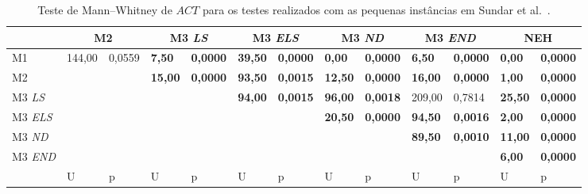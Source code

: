 \begin{table}[H]
\caption{Teste de Mann–Whitney de $ACT$ para os testes realizados com as pequenas instâncias em Sundar et al.~\cite{sundarHybridArtificialBee2017}.}
\label{tab:P1_hipothesis_ACT}
\setlength{\tabcolsep}{3pt} %
\begin{tabular}{l|ll|ll|ll|ll|ll|ll}
                       & \multicolumn{2}{c|}{M2}            & \multicolumn{2}{c|}{M3 \textit{LS}} & \multicolumn{2}{c|}{M3 \textit{ELS}} & \multicolumn{2}{c|}{M3 \textit{ND}} & \multicolumn{2}{c|}{M3 \textit{END}} & \multicolumn{2}{c}{NEH}          \\ \hline
M1                               & 144,00     & 0,0559    & \textbf{7,50}            & \textbf{0,0000}          & \textbf{39,50}           & \textbf{0,0000}           & \textbf{0,00}            & \textbf{0,0000}          & \textbf{6,50}            & \textbf{0,0000}           & \textbf{0,00}  & \textbf{0,0000} \\
M2                               & \textbf{}  & \textbf{} & \textbf{15,00}           & \textbf{0,0000}          & \textbf{93,50}           & \textbf{0,0015}           & \textbf{12,50}           & \textbf{0,0000}          & \textbf{16,00}           & \textbf{0,0000}           & \textbf{1,00}  & \textbf{0,0000} \\
M3 \textit{LS}  & \textbf{}  & \textbf{} & \textbf{}                & \textbf{}                & \textbf{94,00}           & \textbf{0,0015}           & \textbf{96,00}           & \textbf{0,0018}          & 209,00                   & 0,7814                    & \textbf{25,50} & \textbf{0,0000} \\
M3 \textit{ELS} & \textbf{}  & \textbf{} & \textbf{}                & \textbf{}                & \textbf{}                & \textbf{}                 & \textbf{20,50}           & \textbf{0,0000}          & \textbf{94,50}           & \textbf{0,0016}           & \textbf{2,00}  & \textbf{0,0000} \\
M3 \textit{ND}  & \textbf{}  & \textbf{} & \textbf{}                & \textbf{}                & \textbf{}                & \textbf{}                 & \textbf{}                & \textbf{}                & \textbf{89,50}           & \textbf{0,0010}           & \textbf{11,00} & \textbf{0,0000} \\
M3 \textit{END} & \textbf{}  & \textbf{} & \textbf{}                & \textbf{}                & \textbf{}                & \textbf{}                 & \textbf{}                & \textbf{}                & \textbf{}                & \textbf{}                 & \textbf{6,00}  & \textbf{0,0000} \\ \hline
                                 & U          & p         & U                        & p                        & U                        & p                         & U                        & p                        & U                        & p                         & U              & p              
\end{tabular}
\end{table}



